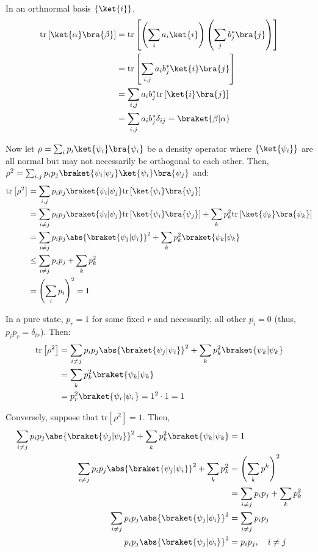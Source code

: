 \begingroup
\newcommand{\tr}[1]{\mathrm{tr} \left[ #1 \right]}
%
\par In an orthnormal basis $\{\ket{i}\}$,
%
\begin{align}
\tr{\ket{\alpha} \bra{\beta}}
&= \tr{\left( \sum_i{a_i \ket{i}} \right) \left( \sum_j{b_j^* \bra{j}} \right)} \\
&= \tr{\sum_{i, j}{a_i b_j^* \ket{i} \bra{j}}} \\
&= \sum_{i, j}{a_i b_j^* \tr{\ket{i} \bra{j}}} \\
&= \sum_{i, j}{a_i b_j^* \delta_{ij}} = \braket{\beta|\alpha}
\end{align}
%
\par Now let $\rho = \sum_i{p_i \ket{\psi_i} \bra{\psi_i}}$ be a density operator where $\{\ket{\psi_i}\}$ are all normal but may not necessarily be orthogonal to each other.
%
Then, $\rho^2 = \sum_{i, j}{p_i p_j \braket{\psi_i|\psi_j} \ket{\psi_i} \bra{\psi_j}}$ and:
%
\begin{align}
\tr{\rho^2}
&= \sum_{i, j}{p_i p_j \braket{\psi_i|\psi_j} \tr{\ket{\psi_i} \bra{\psi_j}}} \\
&= \sum_{i \ne j}{p_i p_j \braket{\psi_i|\psi_j} \tr{\ket{\psi_i} \bra{\psi_j}}} + \sum_k{p_k^2 \tr{\ket{\psi_k} \bra{\psi_k}}} \\
&= \sum_{i \ne j}{p_i p_j \abs{\braket{\psi_j|\psi_i}}}^2 + \sum_k{p_k^2 \braket{\psi_k|\psi_k}} \\
&\le \sum_{i \ne j}{p_i p_j} + \sum_k{p_k^2} \\
&= \left( \sum_i{p_i} \right)^2 = 1
\end{align}
%
\par In a pure state, $p_r = 1$ for some fixed $r$ and necessarily, all other $p_i = 0$ (thus, $p_i p_r = \delta_{ir}$). Then:
%
\begin{align}
\tr{\rho^2} &= \sum_{i \ne j}{p_i p_j \abs{\braket{\psi_j|\psi_i}}}^2 + \sum_k{p_k^2 \braket{\psi_k|\psi_k}} \\
&= \sum_k{p_k^2 \braket{\psi_k|\psi_k}} \\
&= p_r^2 \braket{\psi_r|\psi_r} = 1^2 \cdot 1 = 1
\end{align}
%
\par Conversely, suppose that $\tr{\rho^2} = 1$. Then,
%
\begin{align}
\sum_{i \ne j}{p_i p_j \abs{\braket{\psi_j|\psi_i}}}^2 + \sum_k{p_k^2
\braket{\psi_k|\psi_k}} &= 1 \\
\sum_{i \ne j}{p_i p_j \abs{\braket{\psi_j|\psi_i}}}^2 + \sum_k{p_k^2} &= \left(
\sum_k{p^k} \right)^2 \\
&= \sum_{i \ne j}{p_i p_j} + \sum_k{p_k^2} \\
\sum_{i \ne j}{p_i p_j \abs{\braket{\psi_j|\psi_i}}}^2 &= \sum_{i \ne j}{p_i
p_j} \\
p_i p_j \abs{\braket{\psi_j|\psi_i}}^2 &= p_i p_j, \quad i \ne j
\end{align}
